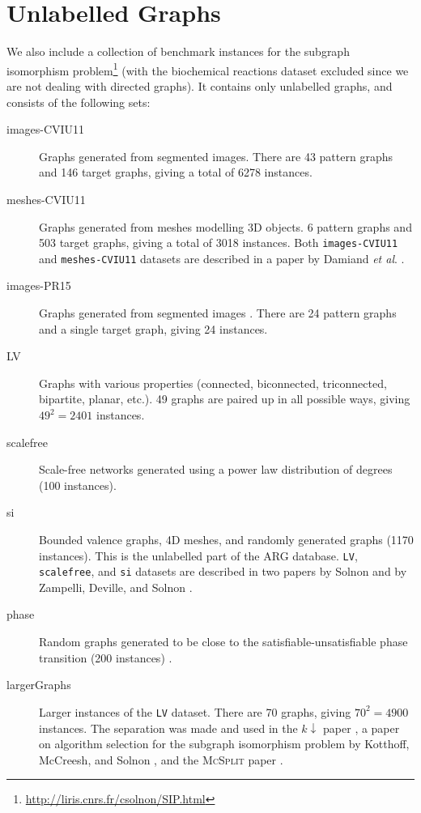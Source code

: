 \documentclass{l4proj}
\theoremstyle{definition}
\theoremstyle{remark}
\newcommand{\etal}{\textit{et al}.}
\begin{document}
\section{Unlabelled Graphs} \label{sec:unlabelled}

We also include a collection of benchmark instances for the subgraph isomorphism
problem\footnote{\url{http://liris.cnrs.fr/csolnon/SIP.html}} (with the
biochemical reactions dataset excluded since we are not dealing with directed
graphs). It contains only unlabelled graphs, and consists of the following sets:

\begin{description}
\item[images-CVIU11] Graphs generated from segmented images. There are 43
  pattern graphs and 146 target graphs, giving a total of \num{6278} instances.
\item[meshes-CVIU11] Graphs generated from meshes modelling 3D
  objects. 6 pattern graphs and 503 target graphs, giving a total of \num{3018}
  instances. Both \texttt{images-CVIU11} and \texttt{meshes-CVIU11} datasets are
  described in a paper by Damiand \etal{} \cite{DBLP:journals/cviu/DamiandSHJS11}.
\item[images-PR15] Graphs generated from segmented images
  \cite{DBLP:journals/pr/SolnonDHJ15}. There are 24 pattern graphs and a single
  target graph, giving 24 instances.
\item[LV] Graphs with various properties (connected, biconnected, triconnected,
  bipartite, planar, etc.). 49 graphs are paired up in all possible ways, giving
  $49^2=\num{2401}$ instances.
\item[scalefree] Scale-free networks generated using a power law distribution of
  degrees (100 instances).
\item[si] Bounded valence graphs, 4D meshes, and randomly generated graphs
  (\num{1170} instances). This is the unlabelled part of the ARG database.
  \texttt{LV}, \texttt{scalefree}, and \texttt{si} datasets are described in
  two papers by Solnon \cite{DBLP:journals/ai/Solnon10} and by Zampelli,
  Deville, and Solnon \cite{DBLP:journals/constraints/ZampelliDS10}.
\item[phase] Random graphs generated to be close to the
  satisfiable-unsatisfiable phase transition (200 instances)
  \cite{DBLP:conf/ijcai/McCreeshPT16}.
\item[largerGraphs] Larger instances of the \texttt{LV} dataset. There are 70
  graphs, giving $70^2=\num{4900}$ instances. The separation was made and used
  in the $k{\downarrow}$ paper \cite{DBLP:conf/aaai/HoffmannMR17}, a paper on
  algorithm selection for the subgraph isomorphism problem by Kotthoff,
  McCreesh, and Solnon \cite{DBLP:conf/lion/KotthoffMS16}, and the
  \textsc{McSplit} paper \cite{DBLP:conf/ijcai/McCreeshPT17}.
\end{description}
\end{document}

